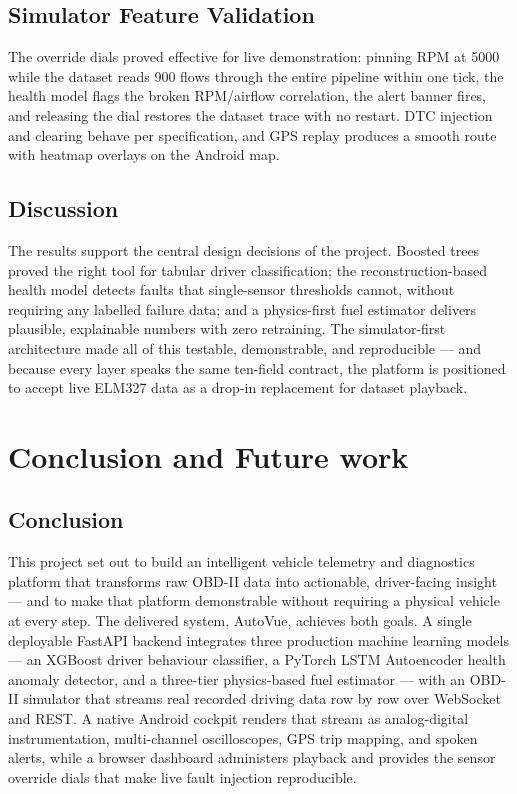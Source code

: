 \documentclass[10pt,a4paper]{report}
\begin{document}
\section{Simulator Feature Validation}

The override dials proved effective for live demonstration: pinning RPM at 5000 while the dataset reads 900 flows through the entire pipeline within one tick, the health model flags the broken RPM/airflow correlation, the alert banner fires, and releasing the dial restores the dataset trace with no restart. DTC injection and clearing behave per specification, and GPS replay produces a smooth route with heatmap overlays on the Android map.

\section{Discussion}

The results support the central design decisions of the project. Boosted trees proved the right tool for tabular driver classification; the reconstruction-based health model detects faults that single-sensor thresholds cannot, without requiring any labelled failure data; and a physics-first fuel estimator delivers plausible, explainable numbers with zero retraining. The simulator-first architecture made all of this testable, demonstrable, and reproducible — and because every layer speaks the same ten-field contract, the platform is positioned to accept live ELM327 data as a drop-in replacement for dataset playback.


\chapter{Conclusion and Future work}
\section{Conclusion}

This project set out to build an intelligent vehicle telemetry and diagnostics platform that transforms raw OBD-II data into actionable, driver-facing insight — and to make that platform demonstrable without requiring a physical vehicle at every step. The delivered system, AutoVue, achieves both goals. A single deployable FastAPI backend integrates three production machine learning models — an XGBoost driver behaviour classifier, a PyTorch LSTM Autoencoder health anomaly detector, and a three-tier physics-based fuel estimator — with an OBD-II simulator that streams real recorded driving data row by row over WebSocket and REST. A native Android cockpit renders that stream as analog-digital instrumentation, multi-channel oscilloscopes, GPS trip mapping, and spoken alerts, while a browser dashboard administers playback and provides the sensor override dials that make live fault injection reproducible. \par
\end{document}
